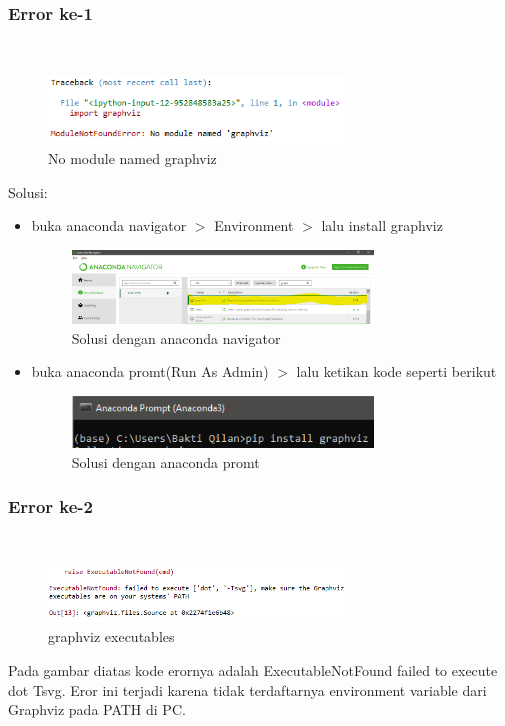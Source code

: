 \subsubsection{Error ke-1}
\hfill\\
\begin{figure}[H]
    \includegraphics[width=8cm]{figures/1174083/figures2/error1.png}
    \centering
    \caption{No module named graphviz}
\end{figure}
Solusi: 
	\begin{itemize}
	\item buka anaconda navigator $>$ Environment $>$  lalu install graphviz
	\begin{figure}[H]
    	\includegraphics[width=8cm]{figures/1174083/figures2/s1.png}
    	\centering
    	\caption{Solusi dengan anaconda navigator}
	\end{figure}
	\item buka anaconda promt(Run As Admin) $>$ lalu ketikan kode seperti berikut
	\begin{figure}[H]
    	\includegraphics[width=8cm]{figures/1174083/figures2/s11.png}
    	\centering
    	\caption{Solusi dengan anaconda promt}
	\end{figure}
	\end{itemize}
	
\subsubsection{Error ke-2}
\hfill\\
\begin{figure}[H]
    \includegraphics[width=8cm]{figures/1174083/figures2/error2.png}
    \centering
    \caption{graphviz executables}
\end{figure}
Pada gambar diatas kode erornya adalah ExecutableNotFound failed to execute dot Tsvg. Eror ini terjadi karena tidak terdaftarnya environment variable dari Graphviz pada PATH di PC.

